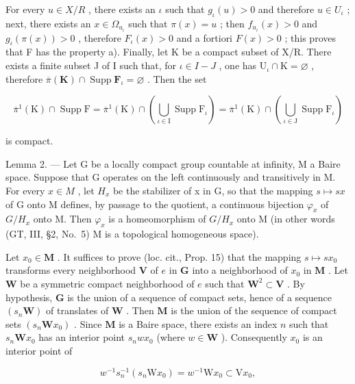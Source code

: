 For every \(u \in X/R\) , there exists an \(\iota\) such that \(g_{\iota}(u) > 0\) and therefore \(u \in U_{\iota}\) ; next, there exists an \(x \in \Omega_{u_{\iota}}\) such that \(\pi(x) = u\) ; then \(f_{u_{\iota}}(x) > 0\) and \(g_{\iota}(\pi(x)) > 0\) , therefore \(F_{\iota}(x) > 0\) and a fortiori \(F(x) > 0\) ; this proves that F has the property a). Finally, let K be a compact subset of X/R. There exists a finite subset J of I such that, for \(\iota \in I - J\) , one has \(\mathrm{U}_{\iota}\cap \mathrm{K} = \varnothing\) , therefore \(\overline{\pi} (\mathbf{K})\cap \operatorname {Supp}\mathbf{F}_{\iota} = \varnothing\) . Then the set

\[
\overline {{\pi}} ^ {1} (\mathrm{K}) \cap \operatorname{Supp} \mathrm{F} = \overline {{\pi}} ^ {1} (\mathrm{K}) \cap \left(\bigcup_ {\iota \in \mathrm{I}} \operatorname{Supp} \mathrm{F} _ {\iota}\right) = \overline {{\pi}} ^ {1} (\mathrm{K}) \cap \left(\bigcup_ {\iota \in \mathrm{J}} \operatorname{Supp} \mathrm{F} _ {\iota}\right)
\]

is compact.

Lemma 2. --- Let G be a locally compact group countable at infinity, M a Baire space. Suppose that G operates on the left continuously and transitively in M. For every \(x \in M\) , let \(H_{x}\) be the stabilizer of x in G, so that the mapping \(s \mapsto sx\) of G onto M defines, by passage to the quotient, a continuous bijection \(\varphi_{x}\) of \(G/H_{x}\) onto M. Then \(\varphi_{x}\) is a homeomorphism of \(G/H_{x}\) onto M (in other words (GT, III, §2, No.~5) M is a topological homogeneous space).

Let \(x_0 \in \mathbf{M}\) . It suffices to prove (loc. cit., Prop. 15) that the mapping \(s \mapsto sx_0\) transforms every neighborhood \(\mathbf{V}\) of \(e\) in \(\mathbf{G}\) into a neighborhood of \(x_0\) in \(\mathbf{M}\) . Let \(\mathbf{W}\) be a symmetric compact neighborhood of \(e\) such that \(\mathbf{W}^2 \subset \mathbf{V}\) . By hypothesis, \(\mathbf{G}\) is the union of a sequence of compact sets, hence of a sequence \((s_n\mathbf{W})\) of translates of \(\mathbf{W}\) . Then \(\mathbf{M}\) is the union of the sequence of compact sets \((s_n\mathbf{W}x_0)\) . Since \(\mathbf{M}\) is a Baire space, there exists an index \(n\) such that \(s_n\mathbf{W}x_0\) has an interior point \(s_nwx_0\) (where \(w \in \mathbf{W}\) ). Consequently \(x_0\) is an interior point of

\[
w ^ {- 1} s _ {n} ^ {- 1} (s _ {n} \mathrm{W} x _ {0}) = w ^ {- 1} \mathrm{W} x _ {0} \subset \mathrm{V} x _ {0},
\]

